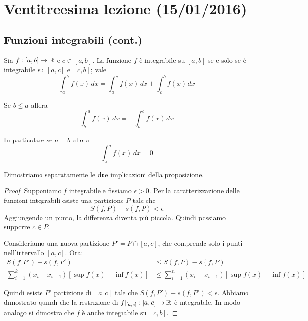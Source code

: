\chapter{Ventitreesima lezione (15/01/2016)}

\section{Funzioni integrabili (cont.)}

\begin{proposition}
Sia $f:[a,b] \to \mathbb R$ e $c \in [a,b]$. La funzione $f$ è integrabile su $[a,b]$ se e solo se è integrabile su $[a,c]$ e $[c,b]$; vale
\begin{equation*}
\int_a^b f(x) \, dx = \int_a^c f(x) \, dx + \int_c^b f(x) \, dx
\end{equation*}
\end{proposition}

\begin{definition}
Se $b \le a$ allora
\begin{equation*}
\int^a_b f(x) \, dx = - \int_b^a f(x) \, dx
\end{equation*}

In particolare se $a = b$ allora
\begin{equation*}
\int_a^a f(x) \, dx = 0
\end{equation*}
\end{definition}

Dimostriamo separatamente le due implicazioni della proposizione.

\begin{proof}
Supponiamo $f$ integrabile e fissiamo $\epsilon > 0$. Per la caratterizzazione delle funzioni integrabili esiste una partizione $P$ tale che 
\begin{equation*}
S(f,P) - s(f,P) < \epsilon
\end{equation*}
Aggiungendo un punto, la differenza diventa più piccola. Quindi possiamo supporre $c \in P$.

Consideriamo una nuova partizione $P' = P \cap [a,c]$, che comprende solo i punti nell'intervallo $[a,c]$. Ora:
\begin{align*}
S(f,P')-s(f,P') &\le S(f,P)-s(f,P) \\
\sum_{i=1}^k (x_i-x_{i-1})[\sup f(x) - \inf f(x)] &\le \sum_{i=1}^n (x_i-x_{i-1})[\sup f(x) - \inf f(x)]
\end{align*}

Quindi esiste $P'$ partizione di $[a,c]$ tale che $S(f,P')-s(f,P')<\epsilon$. Abbiamo dimostrato quindi che la restrizione di $f|_{[a,c]} : [a,c] \to \mathbb R$ è integrabile. In modo analogo si dimostra che $f$ è anche integrabile su $[c,b]$.
\end{proof}

